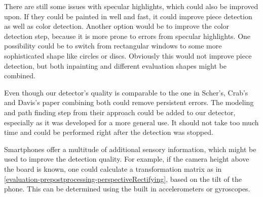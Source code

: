 There are still some issues with specular highlights, which could also be improved upon. If they could be painted in well and fast, it could improve piece detection as well as color detection. Another option would be to improve the color detection step, because it is more prone to errors from specular highlights. One possibility could be to switch from rectangular windows to some more sophisticated shape like circles or discs. Obviously this would not improve piece detection, but both inpainting and different evaluation shapes might be combined.

Even though our detector's quality is comparable to the one in Scher's, Crab's and Davis's paper \cite{scher2008making} combining both could remove persistent errors. The modeling and path finding step from their approach could be added to our detector, especially as it was developed for a more general use. It should not take too much time and could be performed right after the detection was stopped.

Smartphones offer a multitude of additional sensory information, which might be used to improve the detection quality. For example, if the camera height above the board is known, one could calculate a transformation matrix as in \autoref{evaluation-prepostprocessing-perspectiveRectifying}, based on the tilt of the phone. This can be determined using the built in accelerometers or gyroscopes.

